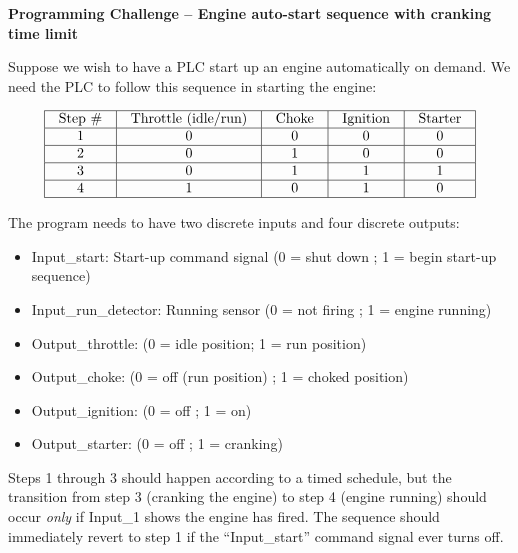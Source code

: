

\noindent
{\bf Programming Challenge -- Engine auto-start sequence with cranking time limit}

\vskip 10pt

Suppose we wish to have a PLC start up an engine automatically on demand.  We need the PLC to follow this sequence in starting the engine:


$$\vbox{\offinterlineskip
\halign{\strut
\vrule \quad\hfil # \ \hfil & 
\vrule \quad\hfil # \ \hfil & 
\vrule \quad\hfil # \ \hfil & 
\vrule \quad\hfil # \ \hfil & 
\vrule \quad\hfil # \ \hfil \vrule \cr
\noalign{\hrule}
%
Step \# & Throttle (idle/run) & Choke & Ignition & Starter \cr
%
\noalign{\hrule}
%
1 & 0 & 0 & 0 & 0 \cr
%
\noalign{\hrule}
%
2 & 0 & 1 & 0 & 0 \cr
%
\noalign{\hrule}
%
3 & 0 & 1 & 1 & 1 \cr
%
\noalign{\hrule}
%
4 & 1 & 0 & 1 & 0 \cr
%
\noalign{\hrule}
} %
}$$ %

The program needs to have two discrete inputs and four discrete outputs:

\begin{itemize}
\item{} Input\_start: Start-up command signal (0 = shut down ; 1 = begin start-up sequence)
\item{} Input\_run\_detector: Running sensor (0 = not firing ; 1 = engine running)
\vskip 5pt
\item{} Output\_throttle: (0 = idle position; 1 = run position)
\item{} Output\_choke: (0 = off (run position) ; 1 = choked position)
\item{} Output\_ignition: (0 = off ; 1 = on)
\item{} Output\_starter: (0 = off ; 1 = cranking)
\end{itemize}

Steps 1 through 3 should happen according to a timed schedule, but the transition from step 3 (cranking the engine) to step 4 (engine running) should occur {\it only} if Input\_1 shows the engine has fired.  The sequence should immediately revert to step 1 if the ``Input\_start'' command signal ever turns off.  

